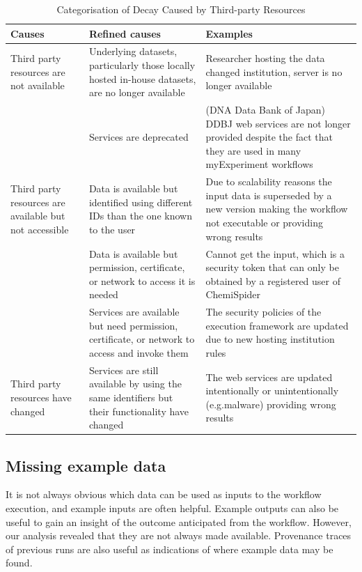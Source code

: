 \begin{table}[ht]
\caption{Categorisation of Decay Caused by Third-party Resources} %
\centering  %
\begin{tabular}{p{1.6in} p{2.2in} p{2.2in}} %
\hline\hline                        %
Causes &  Refined causes & Examples \\
\hline                  

Third party resources are not available & Underlying datasets, particularly those locally hosted in-house datasets, are no longer available & Researcher hosting the data changed institution, server is no longer available 
\\ \cline{2-3} 
			 									& Services are deprecated & (DNA Data Bank of Japan) DDBJ web services are not longer provided despite the fact that they are used in many myExperiment workflows
 \\ \hline

Third party resources are available but not accessible & Data is available but identified using different IDs than the one known to the user & Due to scalability reasons the input data is superseded by a new version making the workflow not executable or providing wrong results
\\ \cline{2-3}

								& Data is available but permission, certificate, or network to access it is needed & Cannot get the input, which is a security token that can only be obtained by a registered user of ChemiSpider
\\ \cline{2-3}
								& Services are available but need permission, certificate, or network to access and invoke them	& The security policies of the execution framework are updated due to new hosting institution rules \\
\hline
Third party resources have changed &  Services are still available by using the same identifiers but their functionality have changed & The web services are updated intentionally or unintentionally (e.g.malware) providing wrong results \\
\hline
\end{tabular}
\label{table:decay} %
\end{table}

\subsection{Missing example data}
It is not always obvious which data can be used as inputs to the workflow execution, and example inputs are often helpful.  Example outputs can also be useful to gain an insight of the outcome anticipated from the workflow. However, our analysis revealed that they are not always made available. Provenance traces of previous runs are also useful as indications of where example data may be found.


